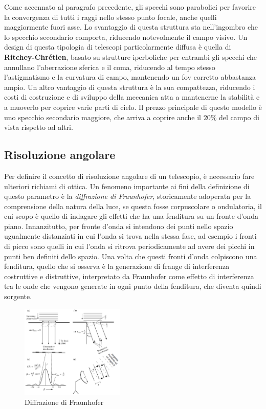 Come accennato al paragrafo precedente, gli specchi sono parabolici per favorire la convergenza di tutti i raggi nello stesso punto focale, anche quelli maggiormente fuori asse. Lo svantaggio di questa struttura sta nell'ingombro che lo specchio secondario comporta, riducendo notevolmente il campo visivo. Un design di questa tipologia di telescopi particolarmente diffusa è quella di \textbf{Ritchey-Chrétien}, basato su strutture iperboliche per entrambi gli specchi che annullano l'aberrazione sferica e il coma, riducendo al tempo stesso l'astigmatismo e la curvatura di campo, mantenendo un fov corretto abbastanza ampio. Un altro vantaggio di questa struttura è la sua compattezza, riducendo i costi di costruzione e di sviluppo della meccanica atta a mantenerne la stabilità e a muoverlo per coprire varie parti di cielo. Il prezzo principale di questo modello è uno specchio secondario maggiore, che arriva a coprire anche il $20\%$ del campo di vista rispetto ad altri.

\subsection*{Risoluzione angolare}

Per definire il concetto di risoluzione angolare di un telescopio, è necessario fare ulteriori richiami di ottica. Un fenomeno importante ai fini della definizione di questo parametro è la \textit{diffrazione di Fraunhofer}, storicamente adoperata per la comprensione della natura della luce, se questa fosse corpuscolare o ondulatoria, il cui scopo è quello di indagare gli effetti che ha una fenditura su un fronte d'onda piano. Innanzitutto, per fronte d'onda si intendono dei punti nello spazio ugualmente distanziati in cui l'onda si trova nella stessa fase, ad esempio i fronti di picco sono quelli in cui l'onda si ritrova periodicamente ad avere dei picchi in punti ben definiti dello spazio. Una volta che questi fronti d'onda colpiscono una fenditura, quello che si osserva è la generazione di frange di interferenza costruttive e distruttive, interpretato da Fraunhofer come effetto di interferenza tra le onde che vengono generate in ogni punto della fenditura, che diventa quindi sorgente.

\begin{figure}
	\vspace{-10pt}
	\centering
	\includegraphics[width=0.44\textwidth]{Immagini/Capitolo2/Fraunhofer.PNG}
	\caption{Diffrazione di Fraunhofer}
	\vspace{-10pt}
\end{figure}

